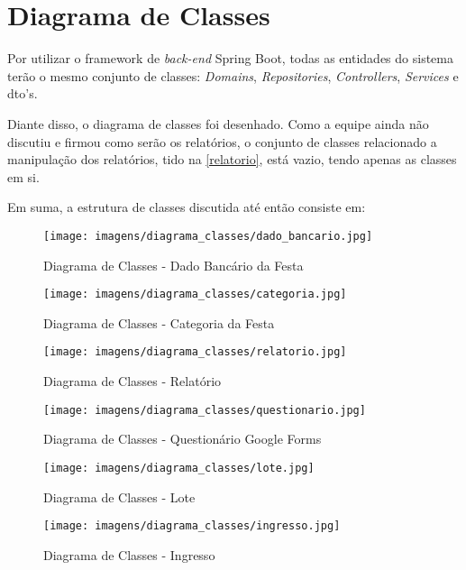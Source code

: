 \chapter{Diagrama de Classes}
\label{classes}
Por utilizar o framework de \textit{back-end} Spring Boot, todas as entidades do sistema terão o mesmo conjunto de classes: \textit{Domains}, \textit{Repositories}, \textit{Controllers}, \textit{Services} e \ac{dto}'s.

Diante disso, o diagrama de classes foi desenhado. Como a equipe ainda não discutiu e firmou como serão os relatórios, o conjunto de classes relacionado a manipulação dos relatórios, tido na \autoref{relatorio}, está vazio, tendo apenas as classes em si. 

Em suma, a estrutura de classes discutida até então consiste em:

\begin{figure}[!htb]
	\centering
	\texttt{[image: imagens/diagrama\_classes/dado\_bancario.jpg]}
	\caption{Diagrama de Classes - Dado Bancário da Festa}
\end{figure}

\begin{figure}[!htb]
	\centering
	\texttt{[image: imagens/diagrama\_classes/categoria.jpg]}
	\caption{Diagrama de Classes - Categoria da Festa}
\end{figure}

\begin{figure}[!htb]
	\centering
	\texttt{[image: imagens/diagrama\_classes/relatorio.jpg]}
	\caption{\label{relatorio}Diagrama de Classes - Relatório}
\end{figure}

\begin{figure}[!htb]
	\centering
	\texttt{[image: imagens/diagrama\_classes/questionario.jpg]}
	\caption{Diagrama de Classes - Questionário Google Forms}
\end{figure}

\begin{figure}[!htb]
	\centering
	\texttt{[image: imagens/diagrama\_classes/lote.jpg]}
	\caption{Diagrama de Classes - Lote}
\end{figure}

\begin{figure}[!htb]
	\centering
	\texttt{[image: imagens/diagrama\_classes/ingresso.jpg]}
	\caption{Diagrama de Classes - Ingresso}
\end{figure}

